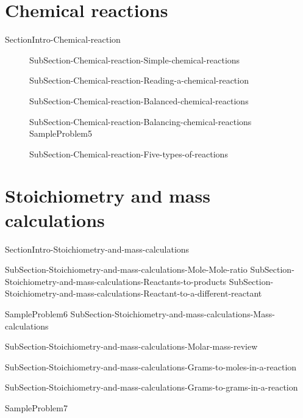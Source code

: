 \documentclass[main.tex]{subfiles}
\newcommand\chapterlabel{Ch-mole}\setcounter{figurenewcounter}{0}\setcounter{tablenewcounter}{0}\setcounter{formulanewcounter}{0}\chapterpicture{../{\chapterlabel}/figure1}\chapterpicturelabel{PngImg}
\begin{document}
\section{Chemical reactions}
{SectionIntro-Chemical-reaction}
\sloppy\begin{description}
\item[] {SubSection-Chemical-reaction-Simple-chemical-reactions}
\item[]{SubSection-Chemical-reaction-Reading-a-chemical-reaction}
\item[]{SubSection-Chemical-reaction-Balanced-chemical-reactions}
\item[]{SubSection-Chemical-reaction-Balancing-chemical-reactions}
{SampleProblem5}
\item[]{SubSection-Chemical-reaction-Five-types-of-reactions}
\end{description}



\section{Stoichiometry and mass calculations}
{SectionIntro-Stoichiometry-and-mass-calculations}


\sloppy \begin{description}

{SubSection-Stoichiometry-and-mass-calculations-Mole-Mole-ratio}
{SubSection-Stoichiometry-and-mass-calculations-Reactants-to-products}
{SubSection-Stoichiometry-and-mass-calculations-Reactant-to-a-different-reactant}








{SampleProblem6}
{SubSection-Stoichiometry-and-mass-calculations-Mass-calculations}

{SubSection-Stoichiometry-and-mass-calculations-Molar-mass-review}


{SubSection-Stoichiometry-and-mass-calculations-Grams-to-moles-in-a-reaction}




{SubSection-Stoichiometry-and-mass-calculations-Grams-to-grams-in-a-reaction}


{SampleProblem7}

\end{description}
\end{document}
